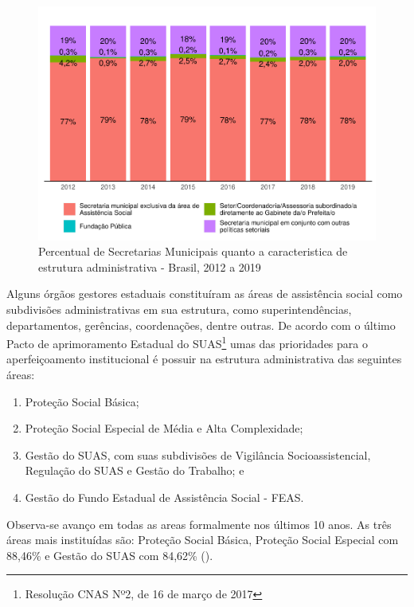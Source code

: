 \documentclass[
  brazilian]{report}
\providecommand{\tightlist}{%
  \setlength{\itemsep}{0pt}\setlength{\parskip}{0pt}}
\begin{document}
\begin{figure}
\includegraphics{Censo-SUAS-2022_files/figure-latex/sec-munic-exc-1} \caption[Percentual de Secretarias Municipais quanto a caracteristica de estrutura administrativa - Brasil, 2012 a 2019]{Percentual de Secretarias Municipais quanto a caracteristica de estrutura administrativa - Brasil, 2012 a 2019}\label{fig:sec-munic-exc}
\end{figure}

Alguns órgãos gestores estaduais constituíram as áreas de assistência
social como subdivisões administrativas em sua estrutura, como
superintendências, departamentos, gerências, coordenações, dentre
outras. De acordo com o último Pacto de aprimoramento Estadual do
SUAS\footnote{Resolução CNAS Nº2, de 16 de março de 2017} umas das
prioridades para o aperfeiçoamento institucional é possuir na estrutura
administrativa das seguintes áreas:

\begin{enumerate}
\def\labelenumi{\arabic{enumi})}
\tightlist
\item
  Proteção Social Básica;
\item
  Proteção Social Especial de Média e Alta Complexidade;
\item
  Gestão do SUAS, com suas subdivisões de Vigilância Socioassistencial,
  Regulação do SUAS e Gestão do Trabalho; e
\item
  Gestão do Fundo Estadual de Assistência Social - FEAS.
\end{enumerate}

Observa-se avanço em todas as areas formalmente nos últimos 10 anos. As
três áreas mais instituídas são: Proteção Social Básica, Proteção Social
Especial com 88,46\% e Gestão do SUAS com 84,62\% ().
\end{document}
